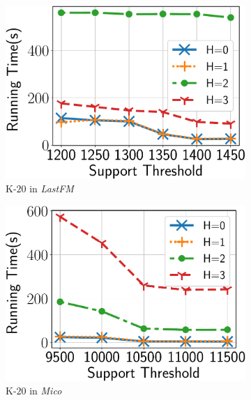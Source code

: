 \begin{figure}
	\begin{subfigure}[b]{0.25\textwidth}
		\includegraphics[keepaspectratio, scale=0.24, angle=0]{img2/lastfm/lastfm_running_time_nobound.pdf}
		\caption{\scriptsize {\sf K-$20$} in {\em LastFM}}
		\label{fig:lastfm_nosb}
	\end{subfigure}%
	\begin{subfigure}[b]{0.25\textwidth}
		\includegraphics[keepaspectratio, scale=0.24, angle=0]{img2/mico/mico_running_time_nobound.pdf}
		\caption{\scriptsize {\sf K-$20$} in {\em Mico}}
		\label{fig:mico_nosb}
	\end{subfigure}%
	\begin{subfigure}[b]{0.25\textwidth}

\end{subfigure}
\end{figure}
